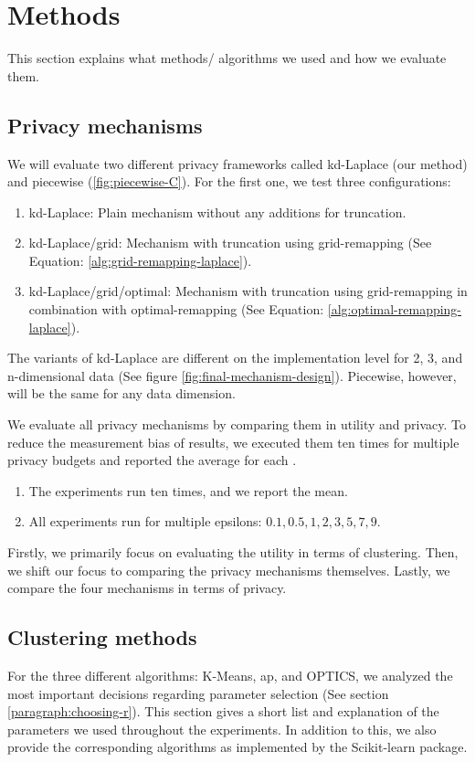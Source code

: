\section{Methods}
This section explains what methods/ algorithms we used and how we evaluate them.

\subsection{Privacy mechanisms}

We will evaluate two different privacy frameworks called kd-Laplace (our method) and piecewise (\ref{fig:piecewise-C}).
For the first one, we test three configurations:
\begin{enumerate}
  \item kd-Laplace: Plain mechanism without any additions for truncation.
  \item kd-Laplace/grid: Mechanism with truncation using grid-remapping (See Equation: \ref{alg:grid-remapping-laplace}).
  \item kd-Laplace/grid/optimal: Mechanism with truncation using grid-remapping in combination with optimal-remapping (See Equation: \ref{alg:optimal-remapping-laplace}).
\end{enumerate}
The variants of kd-Laplace are different on the implementation level for 2, 3, and n-dimensional data (See figure \ref{fig:final-mechanism-design}).
Piecewise, however, will be the same for any data dimension.

We evaluate all privacy mechanisms by comparing them in utility and privacy.
To reduce the measurement bias of results, we executed them ten times for multiple privacy budgets and reported the average for each \citep{9679364}.
\begin{enumerate}
  \item The experiments run ten times, and we report the mean.
  \item All experiments run for multiple epsilons: ${0.1, 0.5, 1, 2, 3, 5, 7, 9}$.
\end{enumerate}
Firstly, we primarily focus on evaluating the utility in terms of clustering.
Then, we shift our focus to comparing the privacy mechanisms themselves.
Lastly, we compare the four mechanisms in terms of privacy.
\newpage
\subsection{Clustering methods}
For the three different algorithms: K-Means, \gls{ap}, and OPTICS, we analyzed the most important decisions regarding parameter selection (See section \ref{paragraph:choosing-r}).
This section gives a short list and explanation of the parameters we used throughout the experiments.
In addition to this, we also provide the corresponding algorithms as implemented by the Scikit-learn package.
